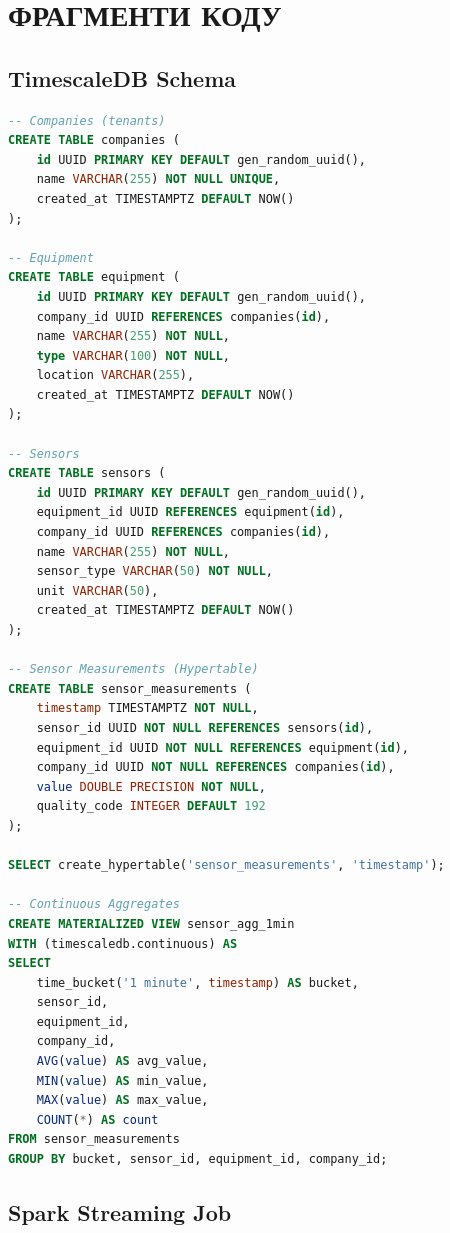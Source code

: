\chapter{ФРАГМЕНТИ КОДУ}

\section{TimescaleDB Schema}

\lstset{style=code}
\begin{lstlisting}[language=SQL, caption={Повна схема бази даних}]
-- Companies (tenants)
CREATE TABLE companies (
    id UUID PRIMARY KEY DEFAULT gen_random_uuid(),
    name VARCHAR(255) NOT NULL UNIQUE,
    created_at TIMESTAMPTZ DEFAULT NOW()
);

-- Equipment
CREATE TABLE equipment (
    id UUID PRIMARY KEY DEFAULT gen_random_uuid(),
    company_id UUID REFERENCES companies(id),
    name VARCHAR(255) NOT NULL,
    type VARCHAR(100) NOT NULL,
    location VARCHAR(255),
    created_at TIMESTAMPTZ DEFAULT NOW()
);

-- Sensors
CREATE TABLE sensors (
    id UUID PRIMARY KEY DEFAULT gen_random_uuid(),
    equipment_id UUID REFERENCES equipment(id),
    company_id UUID REFERENCES companies(id),
    name VARCHAR(255) NOT NULL,
    sensor_type VARCHAR(50) NOT NULL,
    unit VARCHAR(50),
    created_at TIMESTAMPTZ DEFAULT NOW()
);

-- Sensor Measurements (Hypertable)
CREATE TABLE sensor_measurements (
    timestamp TIMESTAMPTZ NOT NULL,
    sensor_id UUID NOT NULL REFERENCES sensors(id),
    equipment_id UUID NOT NULL REFERENCES equipment(id),
    company_id UUID NOT NULL REFERENCES companies(id),
    value DOUBLE PRECISION NOT NULL,
    quality_code INTEGER DEFAULT 192
);

SELECT create_hypertable('sensor_measurements', 'timestamp');

-- Continuous Aggregates
CREATE MATERIALIZED VIEW sensor_agg_1min
WITH (timescaledb.continuous) AS
SELECT 
    time_bucket('1 minute', timestamp) AS bucket,
    sensor_id,
    equipment_id,
    company_id,
    AVG(value) AS avg_value,
    MIN(value) AS min_value,
    MAX(value) AS max_value,
    COUNT(*) AS count
FROM sensor_measurements
GROUP BY bucket, sensor_id, equipment_id, company_id;
\end{lstlisting}

\section{Spark Streaming Job}

